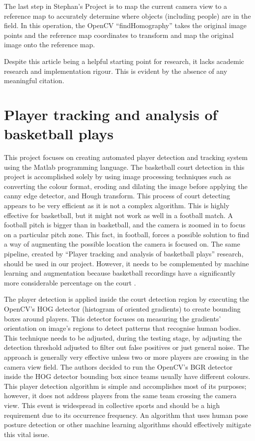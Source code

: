 \documentclass[
    11pt,
    oneside
]{report}
\begin{document}
The last step in Stephan's Project is to map the current camera view to a reference map to accurately determine where objects (including people) are in the field. In this operation, the OpenCV \cite{opencv} ``findHomography'' takes the original image points and the reference map coordinates to transform and map the original image onto the reference map.


Despite this article being a helpful starting point for research, it lacks academic research and implementation rigour. This is evident by the absence of any meaningful citation.


\section{Player tracking and analysis of basketball plays}

This project \cite{baskettrack} focuses on creating automated player detection and tracking system using the Matlab programming language. The basketball court detection in this project is accomplished solely by using image processing techniques such as converting the colour format, eroding and dilating the image before applying the canny edge detector, and Hough transform. This process of court detecting appears to be very efficient as it is not a complex algorithm. This is highly effective for basketball, but it might not work as well in a football match. A football pitch is bigger than in basketball, and the camera is zoomed in to focus on a particular pitch zone. This fact, in football, forces a possible solution to find a way of augmenting the possible location the camera is focused on. The same pipeline, created by ``Player tracking and analysis of basketball plays'' research, should be used in our project. However, it needs to be complemented by machine learning and augmentation because basketball recordings have a significantly more considerable percentage on the court \cite{baskettrack}.


The player detection is applied inside the court detection region by executing the OpenCV's \cite{opencv} HOG detector (histogram of oriented gradients) to create bounding boxes around players. This detector focuses on measuring the gradients' orientation on image's regions to detect patterns that recognise human bodies. This technique needs to be adjusted, during the testing stage, by adjusting the detection threshold adjusted to filter out false positives or just general noise. The approach is generally very effective unless two or more players are crossing in the camera view field. The authors decided to run the OpenCV's \cite{opencv} BGR detector inside the HOG detector bounding box since teams usually have different colours. This player detection algorithm is simple and accomplishes most of its purposes; however, it does not address players from the same team crossing the camera view. This event is widespread in collective sports and should be a high requirement due to its occurrence frequency. An algorithm that uses human pose posture detection or other machine learning algorithms should effectively mitigate this vital issue.
\end{document}
